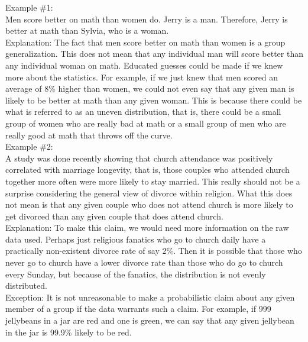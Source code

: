 \documentclass[a4paper,12pt,single,pdftex]{scrbook}
\begin{document}
    
      Example \#1:
    \\

    
      Men score better on math than women do. Jerry is a man. Therefore, Jerry is better at math than Sylvia, who is a woman.
    \\

    
      Explanation: The fact that men score better on math than women is a group generalization. This does not mean that any individual man will score better than any individual woman on math. Educated guesses could be made if we knew more about the statistics. For example, if we just knew that men scored an average of 8\% higher than women, we could not even say that any given man is likely to be better at math than any given woman. This is because there could be what is referred to as an uneven distribution, that is, there could be a small group of women who are really bad at math or a small group of men who are really good at math that throws off the curve.
    \\

    
      Example \#2:
    \\

    
      A study was done recently showing that church attendance was positively correlated with marriage longevity, that is, those couples who attended church together more often were more likely to stay married. This really should not be a surprise considering the general view of divorce within religion. What this does not mean is that any given couple who does not attend church is more likely to get divorced than any given couple that does attend church.
    \\

    
      Explanation: To make this claim, we would need more information on the raw data used. Perhaps just religious fanatics who go to church daily have a practically non-existent divorce rate of say 2\%. Then it is possible that those who never go to church have a lower divorce rate than those who do go to church every Sunday, but because of the fanatics, the distribution is not evenly distributed.
    \\

    
      Exception: It is not unreasonable to make a probabilistic claim about any given member of a group if the data warrants such a claim. For example, if 999 jellybeans in a jar are red and one is green, we can say that any given jellybean in the jar is  99.9\% likely to be red.
    \\
\end{document}
